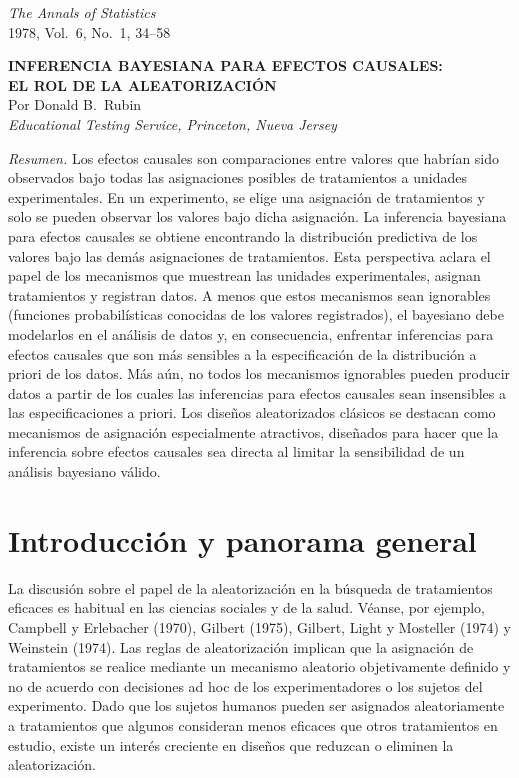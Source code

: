 \documentclass[12pt,a4paper]{article}
\newcommand{\journalheader}{%
  \noindent\textit{The Annals of Statistics}\\
  1978, Vol.\ 6, No.\ 1, 34--58
  \vspace{1.5em}
}
\begin{document}
\journalheader

\begin{center}
  {\Large\bfseries INFERENCIA BAYESIANA PARA EFECTOS CAUSALES:\\[0.3em]
  EL ROL DE LA ALEATORIZACIÓN}\\[1em]
  {\large Por Donald B.\ Rubin}\\[0.4em]
  \textit{Educational Testing Service, Princeton, Nueva Jersey}
\end{center}

\vspace{0.8em}

\noindent\textit{Resumen.} Los efectos causales son comparaciones entre valores que
habrían sido observados bajo todas las asignaciones posibles de tratamientos a unidades
experimentales. En un experimento, se elige una asignación de tratamientos y solo se
pueden observar los valores bajo dicha asignación. La inferencia bayesiana para efectos
causales se obtiene encontrando la distribución predictiva de los valores bajo las demás
asignaciones de tratamientos. Esta perspectiva aclara el papel de los mecanismos que
muestrean las unidades experimentales, asignan tratamientos y registran datos. A menos
que estos mecanismos sean ignorables (funciones probabilísticas conocidas de los valores
registrados), el bayesiano debe modelarlos en el análisis de datos y, en consecuencia,
enfrentar inferencias para efectos causales que son más sensibles a la especificación de
la distribución a priori de los datos. Más aún, no todos los mecanismos ignorables pueden
producir datos a partir de los cuales las inferencias para efectos causales sean
insensibles a las especificaciones a priori. Los diseños aleatorizados clásicos se destacan
como mecanismos de asignación especialmente atractivos, diseñados para hacer que la
inferencia sobre efectos causales sea directa al limitar la sensibilidad de un análisis
bayesiano válido.

\vspace{1em}

\section{Introducción y panorama general}

La discusión sobre el papel de la aleatorización en la búsqueda de tratamientos eficaces
es habitual en las ciencias sociales y de la salud. Véanse, por ejemplo, Campbell y
Erlebacher (1970), Gilbert (1975), Gilbert, Light y Mosteller (1974) y Weinstein (1974).
Las reglas de aleatorización implican que la asignación de tratamientos se realice mediante
un mecanismo aleatorio objetivamente definido y no de acuerdo con decisiones ad hoc de los
experimentadores o los sujetos del experimento. Dado que los sujetos humanos pueden ser
asignados aleatoriamente a tratamientos que algunos consideran menos eficaces que otros
tratamientos en estudio, existe un interés creciente en diseños que reduzcan o eliminen la
aleatorización.
\end{document}
